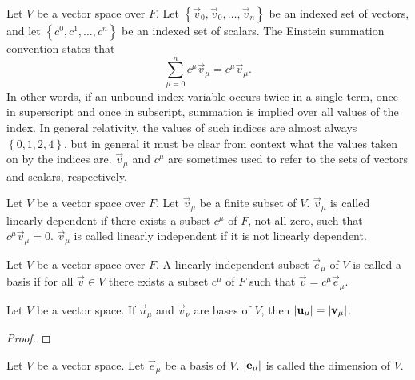 \documentclass[../main.tex]{subfiles}
\begin{document}
    \begin{notation}
        Let \(V\) be a vector space over \(F\). Let \(\left\{\vec{v}_{0},\vec{v}_{0},\dots,\vec{v}_{n}\right\}\) be an indexed set of vectors, and let \(\left\{c^{0},c^{1},\dots,c^{n}\right\}\) be an indexed set of scalars. The Einstein summation convention states that
        \begin{equation*}
            \sum_{\mu=0}^{n}c^{\mu}\vec{v}_{\mu}=c^{\mu}\vec{v}_{\mu}.
        \end{equation*}
        In other words, if an unbound index variable occurs twice in a single term, once in superscript and once in subscript, summation is implied over all values of the index. In general relativity, the values of such indices are almost always \(\left\{0,1,2,4\right\}\), but in general it must be clear from context what the values taken on by the indices are. \(\vec{v}_{\mu}\) and \(c^{\mu}\) are sometimes used to refer to the sets of vectors and scalars, respectively.
    \end{notation}
    \begin{definition}
        Let \(V\) be a vector space over \(F\). Let \(\vec{v}_{\mu}\) be a finite subset of \(V\). \(\vec{v}_{\mu}\) is called linearly dependent if there exists a subset \(c^{\mu}\) of \(F\), not all zero, such that \(c^{\mu}\vec{v}_{\mu}=0\). \(\vec{v}_{\mu}\) is called linearly independent if it is not linearly dependent.
    \end{definition}
    \begin{definition}[Bases]
        Let \(V\) be a vector space over \(F\). A linearly independent subset \(\vec{e}_{\mu}\) of \(V\) is called a basis if for all \(\vec{v}\in{}V\) there exists a subset \(c^{\mu}\) of \(F\) such that \(\vec{v}=c^{\mu}\vec{e}_{\mu}\).
    \end{definition}
    \begin{theorem}
        Let \(V\) be a vector space. If \(\vec{u}_{\mu}\) and \(\vec{v}_{\nu}\) are bases of \(V\), then \(\lvert\mathbf{u}_{\mu}\rvert=\lvert\mathbf{v}_{\mu}\rvert\).
        \begin{proof}
        \end{proof}
    \end{theorem}
    \begin{definition}[Dimension]
        Let \(V\) be a vector space. Let \(\vec{e}_{\mu}\) be a basis of \(V\). \(\lvert\mathbf{e}_{\mu}\rvert\) is called the dimension of \(V\).
    \end{definition}
\end{document}
